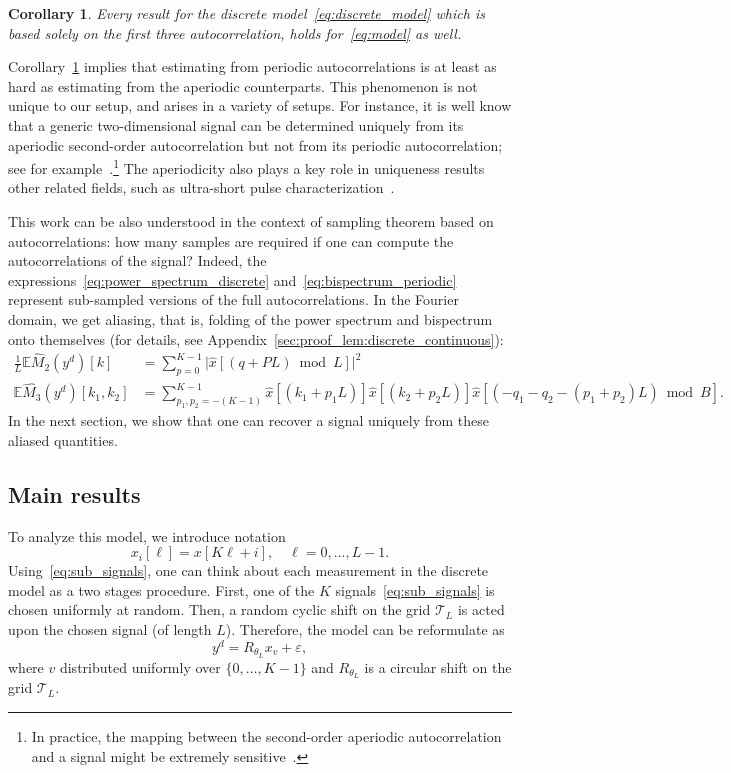 \documentclass[english,12pt]{article}
\newcommand{\E}{\mathbb{E}}
\newcommand{\T}{\mathcal{T}}
\numberwithin{equation}{section}
\numberwithin{thm}{section} %
\newtheorem{cor}[thm]{Corollary}
\begin{document}
\begin{cor} \label{cor:discrete_contonuous}
	Every result for the discrete model~\eqref{eq:discrete_model} which is based solely on the first three autocorrelation, holds for~\eqref{eq:model} as well.
\end{cor}


Corollary~\ref{cor:discrete_contonuous} implies that estimating from  periodic autocorrelations is at least as hard as estimating from the aperiodic counterparts.
This phenomenon is not unique to our setup, and arises in a variety of setups.  
For instance, it is well know that a generic two-dimensional signal can be determined uniquely from its aperiodic second-order autocorrelation but not from its periodic autocorrelation; see for example~\cite{hayes1982reconstruction}.\footnote{In practice, the mapping between the second-order aperiodic autocorrelation and a signal might be extremely sensitive~\cite{barnett2018geometry}.} The aperiodicity also plays a key role in uniqueness results other related fields, such as ultra-short pulse characterization~\cite{bendory2018signal}. 

This work can be also understood in the context of sampling theorem based on autocorrelations: how many samples are required if one can compute the autocorrelations of the signal?
 Indeed, the expressions~\eqref{eq:power_spectrum_discrete} and~\eqref{eq:bispectrum_periodic} represent sub-sampled versions of the full autocorrelations. In the Fourier domain, we get aliasing, that is, folding of the power spectrum and bispectrum onto themselves (for details, see Appendix~\ref{sec:proof_lem:discrete_continuous}):
\begin{align}
\frac{1}{L}\E \hat{M}_2(y^d)[k] &=  \sum_{p=0}^{K-1} \vert \hat{x}[(q+PL)\bmod L]\vert^2 \\
\E \hat{M_3}(y^d)[k_1,k_2] &=  
 \sum_{p_1,p_2=-(K-1)}^{K-1} \hat{x}[(k_1 + p_1L)] \hat{x}[(k_2 + p_2L)]\hat{x}[(-q_1-q_2 - (p_1+p_2)L)\bmod B]. \nonumber
\end{align}
In the next section, we show that one can recover a signal uniquely from these aliased quantities. 

\subsection{Main results}
\label{sec:main_results}

To analyze this model, we introduce notation
\begin{equation} \label{eq:sub_signals}
x_i[\ell] = x[K\ell + i], \quad \ell=0,\ldots,L-1.
\end{equation}
Using~\eqref{eq:sub_signals}, one can think about each measurement in the discrete model 
as a two stages procedure. First, one of the $K$ signals~\eqref{eq:sub_signals} is chosen uniformly at random. Then, a random cyclic shift on the grid $\T_L$ is acted upon the chosen signal (of length $L$).
Therefore, the model can be reformulate  as 
\begin{equation} \label{eq:heter_mra}
y^d =  R_{\theta_{L}} x_{v} + \varepsilon,
\end{equation}
where $v$ distributed uniformly over $\{0,\ldots,K-1\}$ and $R_{\theta_L}$ is a circular shift on the grid $\T_L$. 
\end{document}
